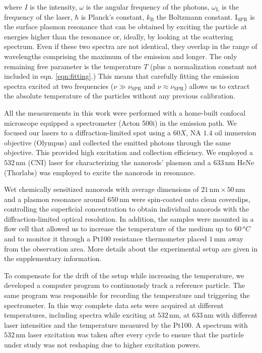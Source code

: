 \documentclass[journal=nalefd,manuscript=letter]{achemso}
\newcommand{\nm}{\ensuremath{\,\textrm{nm}}}
\newcommand{\mm}{\ensuremath{\,\textrm{mm}}}
\begin{document}
\noindent where $I$ is the intensity, $\omega$ is the angular frequency of the
photons, $\omega_\textrm{L}$ is the frequency of the laser, $\hbar$ is Planck's
constant, $k_\textrm{B}$ the Boltzmann constant. $\textrm{I}_{\textrm{SPR}}$ is
the surface plasmon resonance that can be obtained by exciting the particle at
energies higher than the resonance or, ideally, by looking at the scattering
spectrum. Even if these two spectra are not identical, they overlap in the range
of wavelengths comprising the maximum of the emission and
longer\cite{Yorulmaz2012}. The only remaining free parameter is the temperature $T$ (plus a
normalization constant not included in eqn.
\ref{eqn:fitting}.) This means that carefully fitting the emission spectra
excited at two frequencies ($\nu\gg\nu_{\textrm{SPR}}$ and
$\nu\approx\nu_{\textrm{SPR}}$) allows us to extract the absolute temperature of
the particles without any previous calibration.



All the measurements in this work were performed with a home-built confocal
microscope equipped a spectrometer (Acton 500i) in the emission path. We focused
our lasers to a diffraction-limited spot using a $60X$, NA $1.4$ oil
immersion objective (Olympus) and collected the emitted photons through the same objective.
This provided high excitation and collection efficiency. 
We employed a $532\nm$ (CNI) laser for
characterizing the nanorods' plasmon and a $633\nm$ HeNe (Thorlabs) was employed
to excite the nanorods in resonance.

Wet chemically sensitized nanorods\cite{Nikoobakht2003} with average dimensions of $21\nm\times50\nm$ and a plasmon
resonance around $650\nm$ were spin-coated onto clean
coverslips, controlling the superficial concentration to obtain individual nanorods with the 
diffraction-limited optical resolution.
In addition, the samples were mounted in a flow cell that allowed us to increase the temperature of the medium
up to $60\,^oC$ and to monitor it through a Pt100 resistance thermometer placed
$1\mm$ away from the observation area. More details about the experimental
setup are given in the supplementary information.



To compensate for the drift of the setup while increasing the temperature, we
developed a computer program to continuously track a reference particle. The
same program was responsible for recording the temperature and triggering the
spectrometer. In this way complete data sets were acquired at different
temperatures, including spectra while exciting at $532\nm$, at $633\nm$ with
different laser intensities and the temperature measured by the Pt100. A
spectrum with $532\nm$ laser excitation was taken after every cycle to ensure
that the particle under study was not reshaping due to higher excitation powers.
\end{document}
